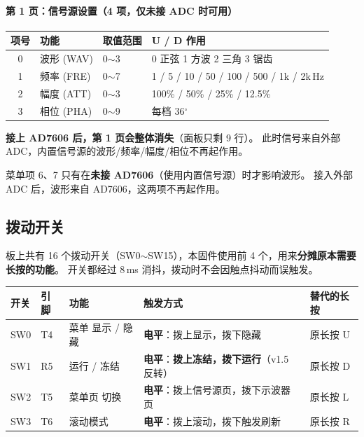 \documentclass[UTF8,a4paper,11pt]{ctexart}
\begin{document}
\paragraph{第 1 页：信号源设置（4 项，仅未接 ADC 时可用）}
\begin{center}
\small
\begin{tabular}{clll}
\toprule
项号 & 功能 & 取值范围 & U / D 作用\\
\midrule
0 & 波形 (WAV) & 0$\sim$3 & 0 正弦 1 方波 2 三角 3 锯齿\\
1 & 频率 (FRE) & 0$\sim$7 & 1 / 5 / 10 / 50 / 100 / 500 / 1k / 2k\,Hz\\
2 & 幅度 (ATT) & 0$\sim$3 & 100\% / 50\% / 25\% / 12.5\%\\
3 & 相位 (PHA) & 0$\sim$9 & 每档 36$^\circ$\\
\bottomrule
\end{tabular}
\end{center}

\begin{tipbox}
\textbf{接上 AD7606 后，第 1 页会整体消失}（面板只剩 9 行）。
此时信号来自外部 ADC，内置信号源的波形/频率/幅度/相位不再起作用。
\end{tipbox}

\begin{tipbox}
菜单项 6、7 只有在\textbf{未接 AD7606}（使用内置信号源）时才影响波形。
接入外部 ADC 后，波形来自 AD7606，这两项不再起作用。
\end{tipbox}

\subsection{拨动开关}
\label{sec:sw}

板上共有 16 个拨动开关（SW0$\sim$SW15），本固件使用前 4 个，用来\textbf{分摊原本需要长按的功能}。
开关都经过 8\,ms 消抖，拨动时不会因触点抖动而误触发。

\begin{center}
\small
\begin{tabular}{lllll}
\toprule
开关 & 引脚 & 功能 & 触发方式 & 替代的长按\\
\midrule
SW0 & T4 & 菜单 显示 / 隐藏 & \textbf{电平}：拨上显示，拨下隐藏 & 原长按 U\\
SW1 & R5 & 运行 / 冻结 & \textbf{电平}：\textbf{拨上冻结，拨下运行}（v1.5 反转） & 原长按 D\\
SW2 & T5 & 菜单页 切换 & \textbf{电平}：拨上信号源页，拨下示波器页 & 原长按 L\\
SW3 & T6 & 滚动模式 & \textbf{电平}：拨上滚动，拨下触发刷新 & 原长按 R\\
\bottomrule
\end{tabular}
\end{center}
\end{document}
